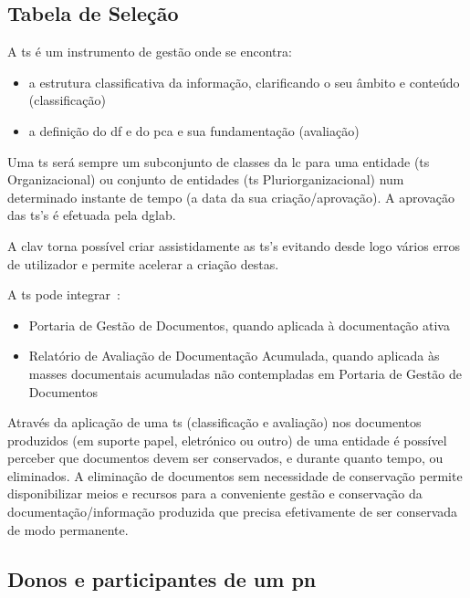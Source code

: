 \subsection{Tabela de Seleção}

A \acrfull{ts} é um instrumento de gestão onde se encontra:~\cite{tsDef}
\begin{itemize}
    \item a estrutura classificativa da informação, clarificando o seu âmbito e conteúdo (classificação)
    \item a definição do \acrlong{df} e do \acrlong{pca} e sua fundamentação (avaliação)
\end{itemize}

Uma \acrshort{ts} será sempre um subconjunto de classes da \acrshort{lc} para uma entidade (\acrshort{ts} Organizacional) ou conjunto de entidades (\acrshort{ts} Pluriorganizacional) num determinado instante de tempo (a data da sua criação/aprovação). A aprovação das \acrshort{ts}'s é efetuada pela \acrshort{dglab}.

A \acrshort{clav} torna possível criar assistidamente as \acrshort{ts}'s evitando desde logo vários erros de utilizador e permite acelerar a criação destas.

A \acrshort{ts} pode integrar~\cite{tsDef}:
\begin{itemize}
    \item Portaria de Gestão de Documentos, quando aplicada à documentação ativa
    \item Relatório  de  Avaliação  de  Documentação  Acumulada, quando aplicada às masses documentais acumuladas não contempladas em Portaria de Gestão de Documentos
\end{itemize}

Através da aplicação de uma \acrshort{ts} (classificação e avaliação) nos documentos produzidos (em suporte papel, eletrónico ou outro) de uma entidade é possível perceber que documentos devem ser conservados, e durante quanto tempo, ou eliminados. A eliminação de documentos sem necessidade de conservação permite disponibilizar meios e recursos para a conveniente gestão e conservação da documentação/informação produzida que precisa efetivamente de ser conservada de modo permanente.~\cite{ts}

\subsection{Donos e participantes de um \acrlong{pn}}

